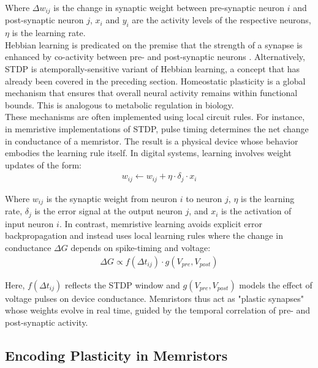 \noindent Where $\Delta w_{ij}$ is the change in synaptic weight between pre-synaptic neuron $i$ and post-synaptic neuron $j$, $x_i$ and $y_i$ are the activity levels of the respective neurons, $\eta$ is the learning rate. \\

\noindent Hebbian learning is predicated on the premise that the strength of a synapse is enhanced by co-activity between pre- and post-synaptic neurons \cite{frenkel2019morphic}. Alternatively, STDP is atemporally-sensitive variant of Hebbian learning, a concept that has already been covered in the preceding section. Homeostatic plasticity is a global mechanism that ensures that overall neural activity remains within functional bounds. This is analogous to metabolic regulation in biology.\\

\noindent These mechanisms are often implemented using local circuit rules. For instance, in memristive implementations of STDP, pulse timing determines the net change in conductance of a memristor. The result is a physical device whose behavior embodies the learning rule itself. In digital systems, learning involves weight updates of the form:
\begin{align}
    w_{ij} \leftarrow w_{ij} + \eta \cdot \delta_j \cdot x_i \label{eq:2.32} 
\end{align}

\noindent Where $w_{ij}$ is the synaptic weight from neuron $i$ to neuron $j$, $\eta$ is the learning rate, $\delta_j$ is the error signal at the output neuron $j$, and $x_i$ is the activation of input neuron $i$. In contrast, memristive learning avoids explicit error backpropagation and instead uses local learning rules where the change in conductance $\Delta G$ depends on spike-timing and voltage:
\begin{align}
    \Delta G \varpropto f(\Delta t_{ij}) \cdot g(V_{pre}, V_{post}) \label{eq:2.33}
\end{align}

\noindent Here, $f(\Delta t_{ij})$ reflects the STDP window and $g(V_{pre}, V_{post})$ models the effect of voltage pulses on device conductance. Memristors thus act as "plastic synapses" whose weights evolve in real time, guided by the temporal correlation of pre- and post-synaptic activity.

\subsection[Encoding Plasticity in Memristors]{Encoding Plasticity in Memristors}

